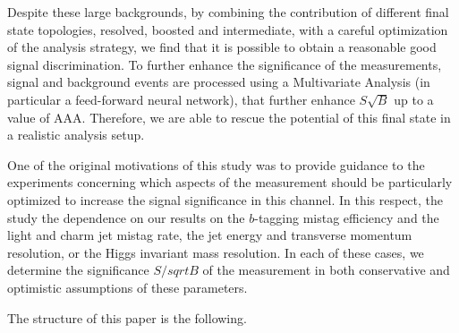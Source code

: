 Despite these large backgrounds, by combining the contribution of different final state
topologies, resolved, boosted and intermediate, with a careful optimization
of the analysis strategy, we find that it is possible to obtain a reasonable
good signal discrimination.
%
To further enhance the significance of the measurements, signal and background events
are processed using a Multivariate Analysis (in particular a feed-forward neural
network), that further enhance $S\sqrt{B}$ up to a value of AAA.
%
Therefore, we are able to rescue the potential of this final state in a realistic
analysis setup.

One of the original motivations of this study was to provide guidance to the experiments
concerning which aspects of the measurement should be particularly optimized
to increase the signal significance in this channel.
%
In this respect, the study the dependence on our results on the $b$-tagging mistag
efficiency and the light and charm jet mistag rate, the jet energy and transverse
momentum resolution, or the Higgs invariant mass resolution.
%
In each of these cases, we determine the significance  $S/sqrt{B}$ of the
measurement in both conservative and optimistic assumptions of these
parameters.


The structure of this paper is the following.
